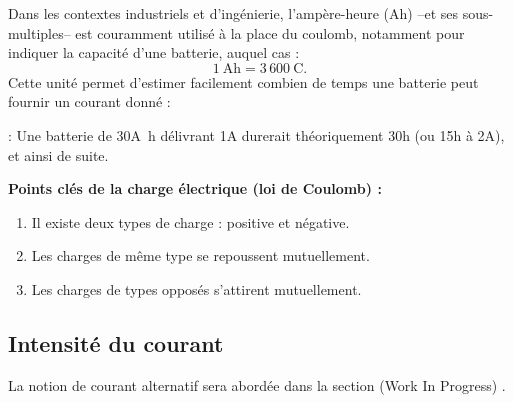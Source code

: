 \begin{figure}[H]
  \centering
\end{figure}

Dans les contextes industriels et d’ingénierie, l’ampère-heure (Ah) --et ses
sous-multiples-- est couramment utilisé à la place du coulomb, notamment pour
indiquer la capacité d’une batterie, auquel cas :
\[
  1~\unit{\ampere\hour} = 3\,600~\unit{\coulomb}.
\]
Cette unité permet d’estimer facilement combien de temps une batterie peut
fournir un courant donné :
\begin{example}:\newline
Une batterie de 30\unit{\ampere\hour}
délivrant 1\unit{\ampere} durerait théoriquement 30\unit{\hour} (ou 15\unit{\hour} à
2\unit{\ampere}), et ainsi de suite.
\end{example}
\begin{Note}
\textbf{Points clés de la charge électrique (loi de Coulomb) :}
\begin{enumerate}
  \item Il existe deux types de charge : positive et négative.
  \item Les charges de même type se repoussent mutuellement.
  \item Les charges de types opposés s’attirent mutuellement.
\end{enumerate}
\end{Note}

\subsection{Intensité du courant} \label{subsec:current}

\begin{Note}
	La notion de courant alternatif sera abordée dans la section (Work In Progress) .
\end{Note}

